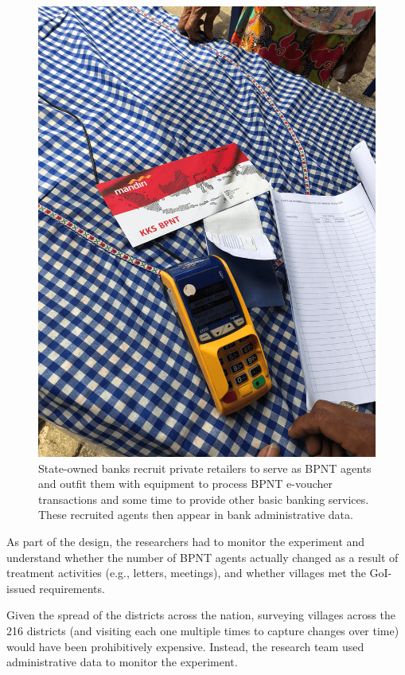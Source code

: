 \documentclass[
]{book}
\begin{document}
\begin{figure}
\includegraphics[width=1\linewidth]{./assets/indonesia/indonesiafigure2web} \caption{State-owned banks recruit private retailers to serve as BPNT agents and outfit them with equipment to process BPNT e-voucher transactions and some time to provide other basic banking services. These recruited agents then appear in bank administrative data.}\label{fig:indonesiafigure2}
\end{figure}

As part of the design, the researchers had to monitor the experiment and understand whether the number of BPNT agents actually changed as a result of treatment activities (e.g., letters, meetings), and whether villages met the GoI-issued requirements.

Given the spread of the districts across the nation, surveying villages across the 216 districts (and visiting each one multiple times to capture changes over time) would have been prohibitively expensive. Instead, the research team used administrative data to monitor the experiment.
\end{document}
